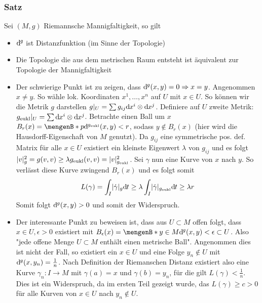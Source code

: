 \subsubsection{Satz}
\label{ssub:231}
Sei $(M,g)$ Riemannsche Mannigfaltigkeit, so gilt
\begin{itemize}[(i)]
\item $\mathrm{d}\mkern-1.0mu^g$ ist Distanzfunktion (im Sinne der Topologie)
\item Die Topologie die aus dem metrischen Raum entsteht ist äquivalent zur Topologie der Mannigfaltigkeit
\end{itemize}
\begin{itemize}[(i)]
\item Der schwierige Punkt ist zu zeigen, dass $\mathrm{d}\mkern-1.0mu^g(x,y) = 0 \Rightarrow x = y$.
Angenommen $x \neq y$.
So wähle lok. Koordinaten $x^1,\ldots,x^n$ auf $U$ mit $x \in U$. So können wir die Metrik $g$ darstellen $g\vert_U = \sum g_{ij} \mathrm{d}\mkern-1.0mu x^i \otimes \mathrm{d}\mkern-1.0mu x^j$. Definiere auf $U$ zweite Metrik: $g_{\text{eukl}}\vert_U = \sum \mathrm{d}\mkern-1.0mu x^i \otimes \mathrm{d}\mkern-1.0mu x^j$. Betrachte einen Ball um $x$ $B_r(x) = \set[p]{\mathd^{g_{\text{eukl}}}(x,y) < r}$, sodass $y \not\in B_r(x)$ (hier wird die Hausdorff-Eigenschaft von $M$ genutzt). Da $g_{ij}$ eine symmetrische pos. def. Matrix für alle $x\in U$ existiert ein kleinste Eigenwert $\lambda$ von $g_{ij}$ und es folgt $\lvert v\rvert_{g}^2 = g(v,v) \geq \lambda g_{\text{eukl}}(v,v) = \lvert v\rvert_{g_{\text{eukl}}}^2$. Sei $\gamma$ nun eine Kurve von $x$ nach $y$. So verlässt diese Kurve zwingend $B_r(x)$ und es folgt somit
\[
L(\gamma) = \int_I \lvert\dot{\gamma}\rvert_g \mathrm{d}\mkern-1.0mu t \geq \lambda \int_I \lvert\dot{\gamma}\rvert_{g_{\text{eukl}}} \mathrm{d}\mkern-1.0mu t \geq \lambda r
\]
Somit folgt $\mathrm{d}\mkern-1.0mu^g (x,y) > 0$ und somit der Widerspruch.
\item Der interessante Punkt zu beweisen ist, dass aus $U\subset M$ offen folgt, dass $x\in U, \epsilon>0$ existiert mit $B_\epsilon (x) = \set[y\in M]{\mathd^g (x,y)<\epsilon}\subset U$. Also "jede offene Menge $U\subset M$ enthält einen metrische Ball". Angenommen dies ist nicht der Fall, so existiert ein $x\in U$ und eine Folge $y_n\not\in U$ mit $\mathrm{d}\mkern-1.0mu^g(x,y_n) = \frac{1}{n}$. Nach Definition der Riemanschen Distanz existiert also eine Kurve $\gamma_n: I \to M$ mit $\gamma(a) = x$ und $\gamma(b) = y_n$, für die gilt $L(\gamma) < \frac{1}{n}$. Dies ist ein Widerspruch, da im ersten Teil gezeigt wurde, das $L(\gamma) \geq c > 0$ für alle Kurven von $x\in U$ nach $y_n \not\in U$.
\end{itemize}

